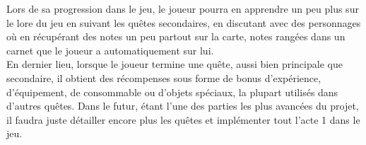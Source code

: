 Lors de sa progression dans le jeu, le joueur pourra en apprendre un peu plus sur le lore du jeu en suivant les quêtes secondaires, en discutant avec des personnages où en récupérant des notes un peu partout sur la carte, notes rangées dans un carnet que le joueur a automatiquement sur lui.
\\

En dernier lieu, lorsque le joueur termine une quête, aussi bien principale que secondaire, il obtient des récompenses sous forme de bonus d'expérience, d'équipement, de consommable ou d'objets spéciaux, la plupart utilisés dans d'autres quêtes. Dans le futur, étant l'une des parties les plus avancées du projet, il faudra juste détailler encore plus les quêtes et implémenter tout l'acte 1 dans le jeu.
\\

